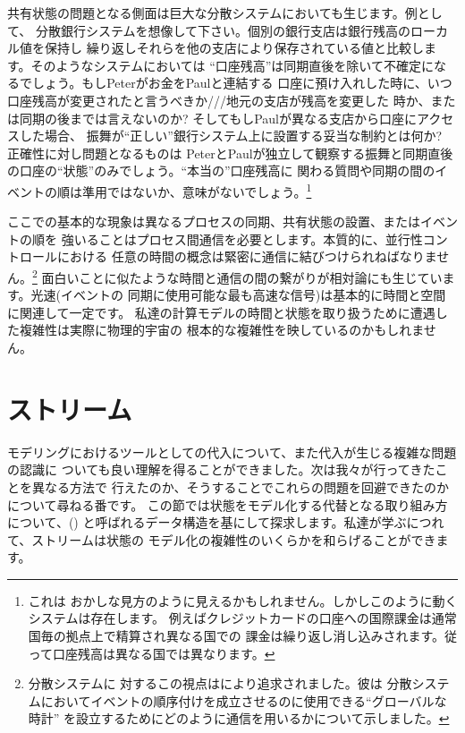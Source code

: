 共有状態の問題となる側面は巨大な分散システムにおいても生じます。例として、
分散銀行システムを想像して下さい。個別の銀行支店は銀行残高のローカル値を保持し
繰り返しそれらを他の支店により保存されている値と比較します。そのようなシステムにおいては
``口座残高''は同期直後を除いて不確定になるでしょう。もしPeterがお金をPaulと連結する
口座に預け入れした時に、いつ口座残高が変更されたと言うべきか\-/\-/\-/地元の支店が残高を変更した
時か、または同期の後までは言えないのか? そしてもしPaulが異なる支店から口座にアクセスした場合、
振舞が``正しい''銀行システム上に設置する妥当な制約とは何か? 正確性に対し問題となるものは
PeterとPaulが独立して観察する振舞と同期直後の口座の``状態''のみでしょう。``本当の''口座残高に
関わる質問や同期の間のイベントの順は準用ではないか、意味がないでしょう。\footnote{これは
おかしな見方のように見えるかもしれません。しかしこのように動くシステムは存在します。
例えばクレジットカードの口座への国際課金は通常国毎の拠点上で精算され異なる国での
課金は繰り返し消し込みされます。従って口座残高は異なる国では異なります。}



ここでの基本的な現象は異なるプロセスの同期、共有状態の設置、またはイベントの順を
強いることはプロセス間通信を必要とします。本質的に、並行性コントロールにおける
任意の時間の概念は緊密に通信に結びつけられねばなりません。\footnote{分散システムに
対するこの視点はにより追求されました。彼は
分散システムにおいてイベントの順序付けを成立させるのに使用できる``グローバルな時計''
を設立するためにどのように通信を用いるかについて示しました。}
面白いことに似たような時間と通信の間の繋がりが相対論にも生じています。光速(イベントの
同期に使用可能な最も高速な信号)は基本的に時間と空間に関連して一定です。
私達の計算モデルの時間と状態を取り扱うために遭遇した複雑性は実際に物理的宇宙の
根本的な複雑性を映しているのかもしれません。

\section{ストリーム}
\label{Section 3.5}


モデリングにおけるツールとしての代入について、また代入が生じる複雑な問題の認識に
ついても良い理解を得ることができました。次は我々が行ってきたことを異なる方法で
行えたのか、そうすることでこれらの問題を回避できたのかについて尋ねる番です。
この節では状態をモデル化する代替となる取り組み方について、()
と呼ばれるデータ構造を基にして探求します。私達が学ぶにつれて、ストリームは状態の
モデル化の複雑性のいくらかを和らげることができます。



